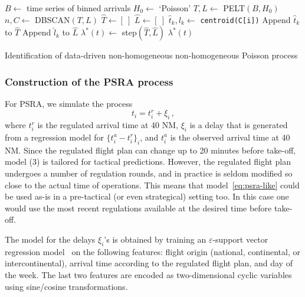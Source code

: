 \documentclass[draft,review]{elsarticle}
\begin{document}
\begin{algorithm}
\begin{algorithmic}[1]
    \STATE \(B \leftarrow \) time series of binned arrivals
    \STATE \(H_0 \leftarrow \) `Poisson'
    \STATE \(T, L \leftarrow \) PELT\((B, H_0)\)
    \STATE \(n, C \leftarrow \) DBSCAN\((T, L)\)
    \STATE {}
    \STATE \(\hat{T} \leftarrow [~] \)
    \STATE \(\hat{L} \leftarrow [~] \)
        \STATE \(\hat{t}_k, \hat{l}_k \leftarrow \) \texttt{centroid(C[i])}
        \STATE Append \(\hat{t}_k\) to \(\hat{T}\)
        \STATE Append \(\hat{l}_k\) to \(\hat{L}\)
    \ENDFOR
    \STATE \(\lambda^\ast(t) \leftarrow \) step\((\hat{T}, \hat{L})\)
    \RETURN \(\lambda^\ast(t)\)
\end{algorithmic}
\caption{Identification of data-driven non-homogeneous non-homogeneous Poisson process}\label{Alg:POISSON}
\end{algorithm}

\subsubsection{Construction of the \acs{PSRA} process}\label{sec:dm_psra}

For \ac{PSRA}, we simulate the process
\begin{equation}
\label{eq:psra-like}
t_i = t^{r}_i + \xi_i \,,
\end{equation}
where \(t^{r}_i\) is the regulated arrival time at 40 NM, \(\xi_i\) is a delay that is generated from a regression model for \(\{t^{a}_i - t^{r}_i\}_i\), and \(t^{a}_i\) is the observed arrival time at 40 NM.
Since the regulated flight plan can change up to 20 minutes before take-off, model (3) is tailored for tactical predictions. However, the regulated flight plan undergoes a number of regulation rounds, and in practice is seldom modified so close to the actual time of operations.
This means that model~\eqref{eq:psra-like} could be used as-is in a pre-tactical (or even strategical) setting too. In this case one would use the most recent regulations available at the desired time before take-off.

The model for the delays \(\xi_i\)'s is obtained by training an \(\varepsilon\)-support vector regression model~\citep{cristianini2000introduction} on the following features: flight origin (national, continental, or intercontinental), arrival time according to the regulated flight plan, and day of the week.
The last two features are encoded as two-dimensional cyclic variables using sine/cosine transformations.
\end{document}
